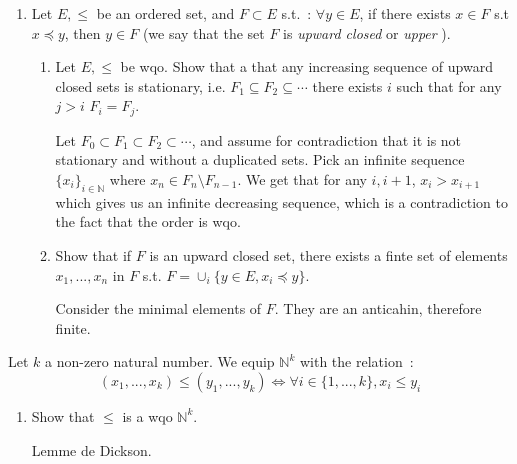\documentclass[a4paper,11pt]{exam}
\newcommand{\N}{\mathbb{N}}
\begin{document}
\begin{questions}
\begin{enumerate}
\begin{enumerate}
\begin{solution}
				\end{solution}
			\end{enumerate}
			\item Let $E,\leq$ be an ordered set, and $F\subset E$ s.t.~:
			$\forall y \in E$, if there exists $x\in F$ s.t $x \preccurlyeq y$, then
			$y\in F$ (we say that the set $F$ is \textit{upward closed} or \textit{upper} ).
			\begin{enumerate}
				\item Let $E,\leq$ be wqo. Show that a that any increasing sequence of upward closed sets is stationary, i.e. $F_1\subseteq F_2\subseteq\cdots$ there exists $i$ such that for any $j>i$ $F_i=F_j$. 
				
				\begin{solution}
					Let $F_0 \subset F_1 \subset F_2 \subset \cdots$, and assume for contradiction that it is not stationary and without a duplicated sets. Pick an infinite sequence $\{x_i\}_{i\in\N}$ where $x_n \in F_n \setminus F_{n-1}$.  
					We get that for any $i,i+1$, $x_i>x_{i+1}$ which gives us an infinite decreasing sequence, which is a contradiction to the fact that the order is wqo.   
					
				\end{solution}
				
				\item Show that if $F$ is an upward closed set, there exists a finte set of elements  $x_1,...,x_n$ in $F$ s.t. $F = \cup_i \{y\in E, x_i \preccurlyeq y\}$.
				\begin{solution}
					Consider the minimal elements of $F$. They are an anticahin, therefore finite.
				\end{solution}
			\end{enumerate}
		\end{enumerate}
		
		
		\question
		Let $k$ a non-zero natural number. We equip $\N^k$ with the relation~:
		\[
		(x_1,...,x_k) \leq (y_1,...,y_k) \Leftrightarrow \forall i \in \{1,...,k\},
		x_i \leq y_i
		\]
		\begin{enumerate}
			\item Show that $\leq$ is a wqo $\N^k$.
			
			\begin{solution}
				Lemme de Dickson.
			\end{solution}
			

\end{enumerate}
\end{questions}
\end{document}
